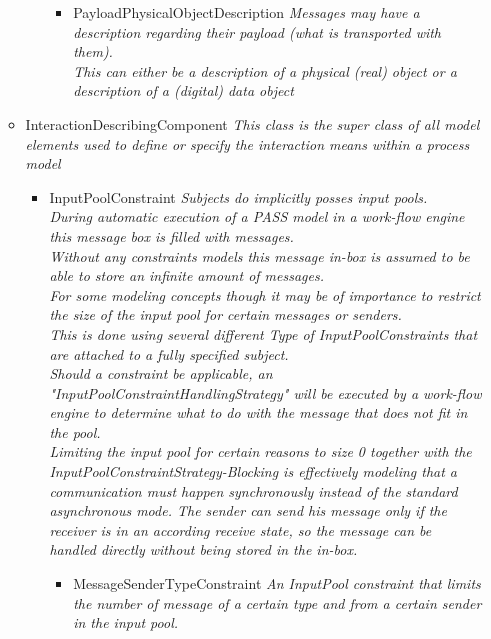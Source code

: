\begin{itemize}
\begin{itemize}
\begin{itemize}
\begin{itemize}
			\item PayloadPhysicalObjectDescription \linebreak \textit{Messages may have a description regarding their payload (what is transported with them).\\This can either be a description of a physical (real) object or a description of a (digital) data object}
		\end{itemize}
	\end{itemize}
	\item InteractionDescribingComponent \linebreak \textit{This class is the super class of all model elements used to define or specify the interaction means within a process model}
	\begin{itemize}
		\item InputPoolConstraint \linebreak \textit{Subjects do implicitly posses input pools.\\
			During automatic execution of a PASS model in a work-flow engine this message box is filled with messages.\\
			Without any constraints models this message in-box is assumed to be able to store an infinite amount of messages.\\
			For some modeling concepts though it may be of importance to restrict the size of the input pool for certain messages or senders.\\This is done using several different Type of InputPoolConstraints that are attached to a fully specified subject.\\Should a constraint be applicable, an "InputPoolConstraintHandlingStrategy" will be executed by a work-flow engine to determine what to do with the message that does not fit in the pool.\\
			Limiting the input pool for certain reasons to size 0 together with the InputPoolConstraintStrategy-Blocking is effectively modeling that a communication must happen synchronously instead of the standard asynchronous mode. The sender can send his message only if the receiver is in an according receive state, so the message can be handled directly without being stored in the in-box.}
		\begin{itemize}
			\item MessageSenderTypeConstraint \linebreak \textit{An InputPool constraint that limits the number of message of a certain type and from a certain sender in the input pool.\\
}
\end{itemize}
\end{itemize}
\end{itemize}
\end{itemize}
